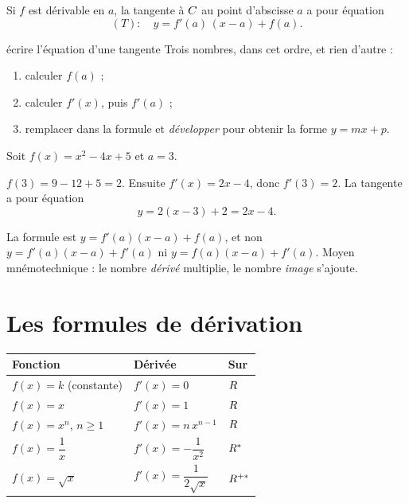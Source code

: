 \begin{theoreme}
Si $f$ est dérivable en $a$, la tangente à $C$ au point d'abscisse $a$ a
pour équation
\[
  (T) : \quad y = f'(a)\,(x-a)+f(a).
\]
\end{theoreme}

\begin{methode}{écrire l'équation d'une tangente}
Trois nombres, dans cet ordre, et rien d'autre :
\begin{enumerate}[label=\textbf{\arabic*.}, leftmargin=*, itemsep=0.15em]
  \item calculer $f(a)$ ;
  \item calculer $f'(x)$, puis $f'(a)$ ;
  \item remplacer dans la formule et \emph{développer} pour obtenir la forme
        $y = mx+p$.
\end{enumerate}
\end{methode}

\begin{exemple}
Soit $f(x) = x^{2}-4x+5$ et $a = 3$.

$f(3) = 9-12+5 = 2$. Ensuite $f'(x) = 2x-4$, donc $f'(3) = 2$. La tangente a
pour équation
\[
  y = 2(x-3)+2 = 2x-4 .
\]
\end{exemple}

\begin{erreurclassique}
La formule est $y = f'(a)(x-a)+f(a)$, et non $y = f'(a)(x-a)+f'(a)$ ni
$y = f(a)(x-a)+f'(a)$. Moyen mnémotechnique : le nombre \emph{dérivé}
multiplie, le nombre \emph{image} s'ajoute.
\end{erreurclassique}

\section{Les formules de dérivation}

\begin{propriete}
\begin{center}
\renewcommand{\arraystretch}{1.45}
\begin{tabular}{|L{3.9cm}|L{3.9cm}|L{3.5cm}|}
\hline
\textbf{Fonction} & \textbf{Dérivée} & \textbf{Sur} \\
\hline
$f(x) = k$ (constante) & $f'(x) = 0$ & $R$ \\
$f(x) = x$ & $f'(x) = 1$ & $R$ \\
$f(x) = x^{n}$, $n \geq 1$ & $f'(x) = n\,x^{n-1}$ & $R$ \\
$f(x) = \dfrac1x$ & $f'(x) = -\dfrac{1}{x^{2}}$ & $R^{*}$ \\
$f(x) = \sqrt x$ & $f'(x) = \dfrac{1}{2\sqrt x}$ & $R^{+*}$ \\
\hline
\end{tabular}
\end{center}
\end{propriete}

